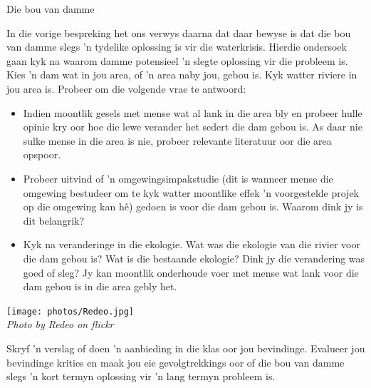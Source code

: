 \par 
\label{m38138*id0123}
            \begin{Investigation}{Die bou van damme}
            \nopagebreak

\label{m38138*id0128031}In die vorige bespreking het ons verwys daarna dat daar bewyse is dat die bou van damme slegs  'n tydelike oplossing is vir die waterkrisis. Hierdie ondersoek gaan kyk na waarom damme potensieel  'n slegte oplossing vir die probleem is. \\
\label{m38138*id473692}Kies  'n dam wat in jou area, of  'n area naby jou, gebou is. Kyk watter riviere in jou area is. Probeer om die volgende vrae te antwoord: \\
\begin{minipage}{.7\textwidth}
\label{m38138*id774}\begin{itemize}[noitemsep]
            \label{m38138*id034582}\item Indien moontlik gesels met mense wat al lank in die area bly en probeer hulle opinie kry oor hoe die lewe verander het sedert die dam gebou is. As daar nie sulke mense in die area is nie, probeer relevante literatuur oor die area opspoor.
\label{m38138*id08323}\item Probeer uitvind of  'n omgewingsimpakstudie (dit is wanneer mense die omgewing bestudeer om te kyk watter moontlike effek  'n voorgestelde projek op die omgewing kan hê) gedoen is voor die dam gebou is. Waarom dink jy is dit belangrik?
\label{m38138*id0832346}\item 
Kyk na veranderinge in die ekologie. Wat was die ekologie van die rivier voor die dam gebou is? Wat is die bestaande ekologie? Dink jy die verandering was goed of sleg? Jy kan moontlik onderhoude voer met mense wat lank voor die dam gebou is in die area gebly het. 
\end{itemize}
        \par 
\end{minipage}
\begin{minipage}{.3\textwidth}
 \begin{center}
  \texttt{[image: photos/Redeo.jpg]} \\
\textsl{Photo by Redeo on flickr}
 \end{center}

\end{minipage}
\label{m38138*id08322432}
Skryf  'n verslag of doen  'n aanbieding in die klas oor jou bevindinge. Evalueer jou bevindinge krities en maak jou eie gevolgtrekkings oor of die bou van damme slegs  'n kort termyn oplossing vir  'n lang termyn probleem is.
\end{Investigation}
